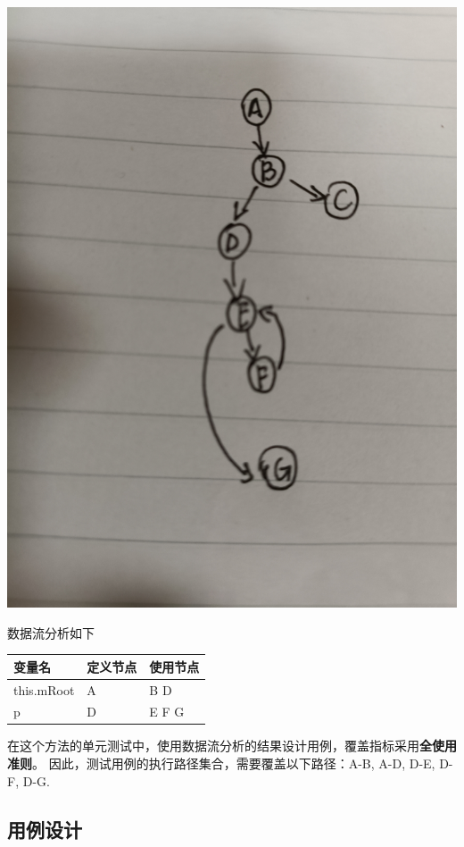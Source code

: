 \documentclass[12pt, a4paper, oneside]{ctexart}
\begin{document}
\includegraphics[scale=0.06]{screenshots/DD-minimum.jpg}

数据流分析如下

\begin{table}[!h]
    \begin{tabular}{|l|l|l|}
    \hline
    变量名 & 定义节点 & 使用节点 \\ \hline
    this.mRoot & A & B D\\ \hline
    p & D & E F G \\ \hline
    \end{tabular}
\end{table}

在这个方法的单元测试中，使用数据流分析的结果设计用例，覆盖指标采用\textbf{全使用准则}。
因此，测试用例的执行路径集合，需要覆盖以下路径：A-B, A-D, D-E, D-F, D-G.

\subsection{用例设计}
\end{document}
